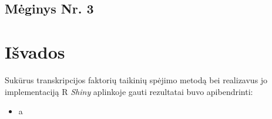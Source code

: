 \documentclass[12pt]{article}
\begin{document}
\subsection{Mėginys Nr. 3}

\newpage


\section{Išvados}
Sukūrus transkripcijos faktorių taikinių spėjimo metodą bei realizavus jo
implementaciją R \emph{Shiny} aplinkoje gauti rezultatai buvo apibendrinti:

\begin{itemize}
    \item a
\end{itemize}

\newpage

\end{document}
